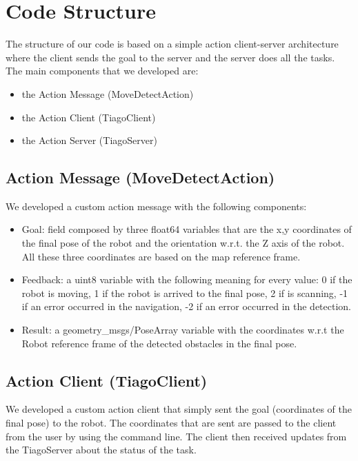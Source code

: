 \section{Code Structure}
The structure of our code is based on a simple action client-server architecture where the client sends the goal to the server and the server does all the tasks. 
The main components that we developed are:
\begin{itemize}
    \item the Action Message (MoveDetectAction)
    \item the Action Client (TiagoClient)
    \item the Action Server (TiagoServer)
\end{itemize}

\subsection{Action Message (MoveDetectAction)}
We developed a custom action message with the following components:
\begin{itemize}
    \item Goal: field composed by three float64 variables that are the x,y coordinates of the final pose of the robot and the orientation w.r.t. the Z axis of the robot. All these three coordinates are based on the map reference frame. 
    \item Feedback: a uint8 variable with the following meaning for every value: 0 if the robot is moving, 1 if the robot is arrived to the final pose, 2 if is scanning, -1 if an error occurred in the navigation, -2 if an error occurred in the detection. 
    \item Result: a geometry\_msgs/PoseArray variable with the coordinates w.r.t the Robot reference frame of the detected obstacles in the final pose. 
\end{itemize}

\subsection{Action Client (TiagoClient)}
We developed a custom action client that simply sent the goal (coordinates of the final pose) to the robot. The coordinates that are sent are passed to the client from the user by using the command line. The client then received updates from the TiagoServer about the status of the task.

